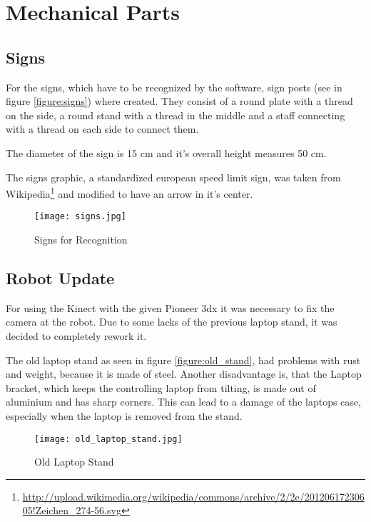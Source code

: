 \chapter{Mechanical Parts}
\graphicspath{{./Mechanical/img/}}



\section{Signs}

For the signs, which have to be recognized by the software, sign posts (see in figure \vref{figure:signs}) where created.
They consist of a round plate with a thread on the side, a round stand with a thread in the middle and a staff connecting
with a thread on each side to connect them.

The diameter of the sign is 15 cm and it's overall height measures 50 cm.

The signs graphic, a standardized european speed limit sign, was taken from 
Wikipedia\footnote{\url{http://upload.wikimedia.org/wikipedia/commons/archive/2/2e/20120617230605!Zeichen_274-56.svg}}
and modified to have an arrow in it's center. 

 \begin{figure}[htp]
\begin{center}
  \texttt{[image: signs.jpg]}
  \caption{Signs for Recognition}
  \label{figure:signs}
\end{center}
\end{figure}

\section{Robot Update}

For using the Kinect with the given Pioneer 3dx it was necessary to fix the camera at the robot.
Due to some lacks of the previous laptop stand, it was decided to completely rework it.

The old laptop stand as seen in figure \vref{figure:old_stand}, had problems with rust and weight,
because it is made of steel. Another disadvantage is, that the Laptop bracket, which keeps the 
controlling laptop from tilting, is made out of aluminium and has sharp corners. This can lead
to a damage of the laptops case, especially when the laptop is removed from the stand. 

\begin{figure}[htp]
\begin{center}
  \texttt{[image: old\_laptop\_stand.jpg]}
  \caption{Old Laptop Stand}
  \label{figure:old_stand}
\end{center}
\end{figure}


